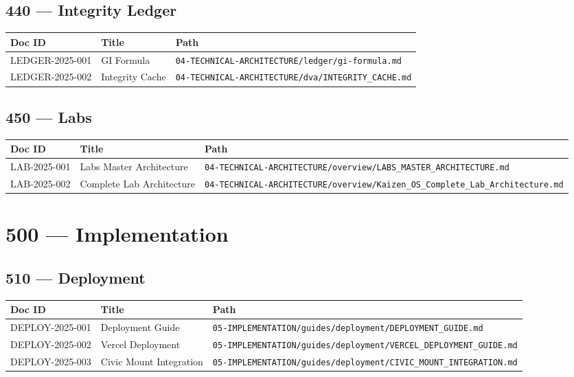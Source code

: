 \documentclass[11pt,a4paper]{article}
\begin{document}
\subsection{440 — Integrity Ledger}

\begin{longtable}{p{2cm}p{8cm}p{3cm}}
\toprule
\textbf{Doc ID} & \textbf{Title} & \textbf{Path} \\
\midrule
LEDGER-2025-001 & GI Formula & \texttt{04-TECHNICAL-ARCHITECTURE/ledger/gi-formula.md} \\
LEDGER-2025-002 & Integrity Cache & \texttt{04-TECHNICAL-ARCHITECTURE/dva/INTEGRITY\_CACHE.md} \\
\bottomrule
\end{longtable}

\subsection{450 — Labs}

\begin{longtable}{p{2cm}p{8cm}p{3cm}}
\toprule
\textbf{Doc ID} & \textbf{Title} & \textbf{Path} \\
\midrule
LAB-2025-001 & Labs Master Architecture & \texttt{04-TECHNICAL-ARCHITECTURE/overview/LABS\_MASTER\_ARCHITECTURE.md} \\
LAB-2025-002 & Complete Lab Architecture & \texttt{04-TECHNICAL-ARCHITECTURE/overview/Kaizen\_OS\_Complete\_Lab\_Architecture.md} \\
\bottomrule
\end{longtable}

\section{500 — Implementation}

\subsection{510 — Deployment}

\begin{longtable}{p{2cm}p{8cm}p{3cm}}
\toprule
\textbf{Doc ID} & \textbf{Title} & \textbf{Path} \\
\midrule
DEPLOY-2025-001 & Deployment Guide & \texttt{05-IMPLEMENTATION/guides/deployment/DEPLOYMENT\_GUIDE.md} \\
DEPLOY-2025-002 & Vercel Deployment & \texttt{05-IMPLEMENTATION/guides/deployment/VERCEL\_DEPLOYMENT\_GUIDE.md} \\
DEPLOY-2025-003 & Civic Mount Integration & \texttt{05-IMPLEMENTATION/guides/deployment/CIVIC\_MOUNT\_INTEGRATION.md} \\
\bottomrule
\end{longtable}
\end{document}
